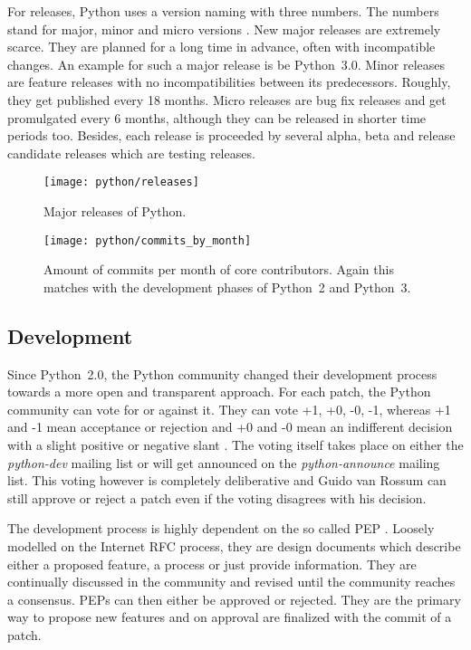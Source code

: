 For releases, Python uses a version naming with three numbers. The numbers
stand for major, minor and micro versions
\cite{PythonDevelopmentCycle,Warsaw2001}. New major releases are extremely
scarce. They are planned for a long time in advance, often with incompatible
changes. An example for such a major release is be Python~3.0. Minor releases
are feature releases with no incompatibilities between its predecessors.
Roughly, they get published every 18 months. Micro releases are bug fix releases
and get promulgated every 6 months, although they can be released in shorter
time periods too. Besides, each release is proceeded by several alpha, beta and
release candidate releases which are testing releases.

\begin{figure}[bhtp]
  \centering
  \texttt{[image: python/releases]}
  \caption[Major Releases of Python]{Major releases of Python.}
\end{figure}

\begin{figure}[htbp]
  \centering
  \texttt{[image: python/commits\_by\_month]}
  \caption[Commits by Month, Python]
  {Amount of commits per month of core contributors. Again this matches with
    the development phases of Python~2 and Python~3.}
  \label{fig:python:cbm}
\end{figure}


\subsection{Development} %

Since Python~2.0, the Python community changed their development process
towards a more open and transparent approach. For each patch, the Python
community can vote for or against it. They can vote +1, +0, -0, -1, whereas +1
and -1 mean acceptance or rejection and +0 and -0 mean an indifferent decision
with a slight positive or negative slant \cite{Warsaw2002}. The voting itself
takes place on either the \emph{python-dev} mailing list or will get announced
on the \emph{python-announce} mailing list. This voting however is completely
deliberative and Guido van Rossum can still approve or reject a patch even if
the voting disagrees with his decision.

The development process is highly dependent on the so called \ac{PEP}
\cite{Warsaw2000}. Loosely modelled on the Internet \ac{RFC} process, they are
design documents which describe either a proposed feature, a process or just
provide information. They are continually discussed in the community and
revised until the community reaches a consensus. \acp{PEP} can then either be
approved or rejected. They are the primary way to propose new features and on
approval are finalized with the commit of a patch.

